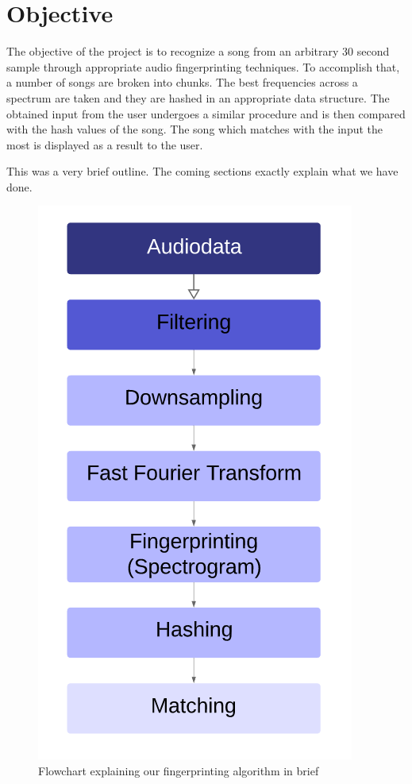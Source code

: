 \documentclass[12pt, a4paper]{IEEEtran}
\begin{document}
\section{Objective}
The objective of the project is to recognize a song from an arbitrary 30 second sample through appropriate audio fingerprinting techniques.
To accomplish that, a number of songs are broken into chunks. The best frequencies across a spectrum are taken and they are hashed in an appropriate data structure.
The obtained input from the user undergoes a similar procedure and is then compared with the hash values of the song. The song which matches with the input the most is displayed as a result to the user.
\par
This was a very brief outline. The coming sections exactly explain what we have done.
\begin{figure}[h]
\includegraphics{Flowchart.PNG}
\captionsetup{justification=centering}
\caption{Flowchart explaining our fingerprinting algorithm in brief}
\end{figure}
\end{document}
